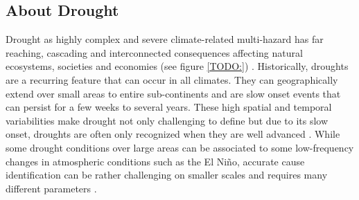 

\subsection{About Drought}\label{subsec:about_drought}

Drought as highly complex and severe climate-related multi-hazard has far reaching, cascading and interconnected consequences affecting natural ecosystems, societies and economies (see figure \ref{TODO:}) \autocite{vereintenationenSpecialReportDrought2021}. Historically, droughts are a recurring feature that can occur in all climates. They can geographically extend over small areas to entire sub-continents and are slow onset events that can persist for a few weeks to several years. These high spatial and temporal variabilities make drought not only challenging to define but due to its slow onset, droughts are often only recognized when they are well advanced \autocite{idmpDroughtWaterScarcity2022,vereintenationenSpecialReportDrought2021}. While some drought conditions over large areas can be associated to some low-frequency changes in atmospheric conditions such as the El Niño, accurate cause identification can be rather challenging on smaller scales and requires many different parameters \autocite{botaiAnalysisDroughtProgression2019, vereintenationenSpecialReportDrought2021}.




